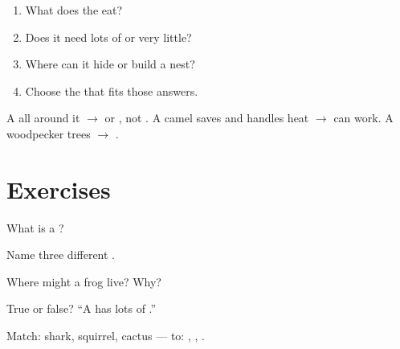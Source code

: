 \begin{method}\label{met:g2:habitats:match}
\begin{enumerate}
  \item What does the  eat?
  \item Does it need lots of  or very little?
  \item Where can it hide or build a nest?
  \item Choose the  that fits those answers.
\end{enumerate}
\end{method}

\begin{example}[Fit]\label{ex:g2:habitats:fit}
A    all around it $\to$  or , not . A
camel saves  and handles heat $\to$  can work. A woodpecker
 trees $\to$ .
\end{example}

\section{Exercises}

\begin{exercise}[$\star$]\label{exo:g2:habitats:1}
What is a ?
\end{exercise}

\begin{exercise}[$\star$]\label{exo:g2:habitats:2}
Name three different .
\end{exercise}

\begin{exercise}[$\star$]\label{exo:g2:habitats:3}
Where might a frog live? Why?
\end{exercise}

\begin{exercise}[$\star$]\label{exo:g2:habitats:4}
True or false? ``A  has lots of .''
\end{exercise}

\begin{exercise}[$\star\star$]\label{exo:g2:habitats:5}
Match: shark, squirrel, cactus --- to: , , .
\end{exercise}

